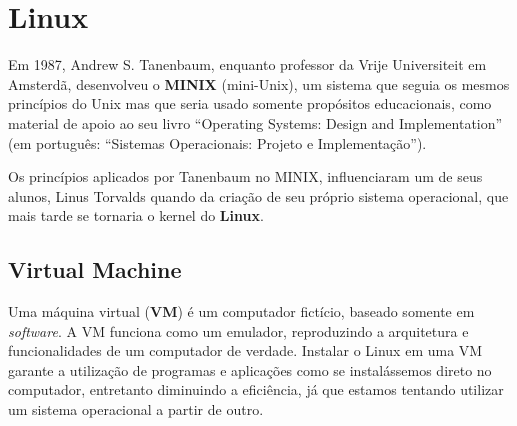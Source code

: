 \documentclass{handout_utfpr}
\begin{document}
\section{Linux}
Em 1987, Andrew S. Tanenbaum, enquanto professor da Vrije Universiteit em Amsterdã, desenvolveu o \textbf{MINIX} (mini-Unix), um sistema que seguia os mesmos princípios do Unix mas que seria usado somente propósitos educacionais, como material de apoio ao seu livro ``Operating Systems: Design and Implementation'' (em português: ``Sistemas Operacionais: Projeto e Implementação'').

Os princípios aplicados por Tanenbaum no MINIX, influenciaram um de seus alunos, Linus Torvalds quando da criação de seu próprio sistema operacional, que mais tarde se tornaria o kernel do \textbf{Linux}.






\subsection{Virtual Machine}
Uma máquina virtual (\textbf{VM}) é um computador fictício, baseado somente em \emph{software}. A VM funciona como um emulador, reproduzindo a arquitetura e funcionalidades de um computador de verdade.
Instalar o Linux em uma VM garante a utilização de programas e aplicações como se instalássemos direto no computador, entretanto diminuindo a eficiência, já que estamos tentando utilizar um sistema operacional a partir de outro.
\end{document}
